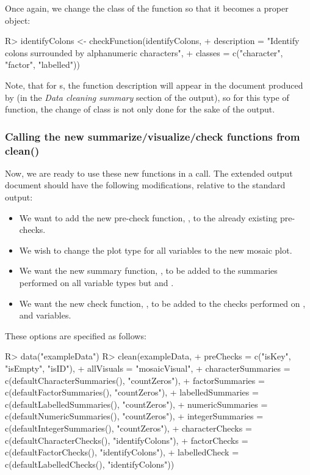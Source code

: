 \documentclass[article,shortnames]{jss}
\begin{document}
Once again, we change the class of the function so that it becomes a
proper  object:

\begin{Schunk}
\begin{Sinput}
R> identifyColons <- checkFunction(identifyColons,
+      description = "Identify colons surrounded by alphanumeric characters",
+      classes = c("character", "factor", "labelled"))
\end{Sinput}
\end{Schunk}

Note, that for s, the function description will
appear in the document produced by  (in the \textit{Data
  cleaning summary} section of the output), so for this type of
function, the change of class is not only done for the sake of the
 output.

\subsubsection{Calling the new summarize/visualize/check functions from clean()}
Now, we are ready to use these new functions in a 
call. The extended  output document should have the
following modifications, relative to the standard  output:
\begin{itemize}
\item We want to add the new pre-check function, , to the already existing pre-checks.
\item We wish to change the plot type for all variables to the new mosaic plot.
\item We want the new summary function, , to be added to the summaries performed on all variable types but  and .
\item We want the new check function, , to be added to the checks performed on ,  and  variables.
\end{itemize}
These options are specified as follows:

\begin{Schunk}
\begin{Sinput}
R> data("exampleData")
R> clean(exampleData,
+    preChecks = c("isKey", "isEmpty", "isID"),
+    allVisuals = "mosaicVisual",
+    characterSummaries = c(defaultCharacterSummaries(), "countZeros"),
+    factorSummaries = c(defaultFactorSummaries(), "countZeros"),
+    labelledSummaries = c(defaultLabelledSummaries(), "countZeros"),
+    numericSummaries = c(defaultNumericSummaries(), "countZeros"),
+    integerSummaries = c(defaultIntegerSummaries(), "countZeros"),
+    characterChecks = c(defaultCharacterChecks(), "identifyColons"),
+    factorChecks = c(defaultFactorChecks(), "identifyColons"),
+    labelledCheck = c(defaultLabelledChecks(), "identifyColons"))
\end{Sinput}
\end{Schunk}
\end{document}
